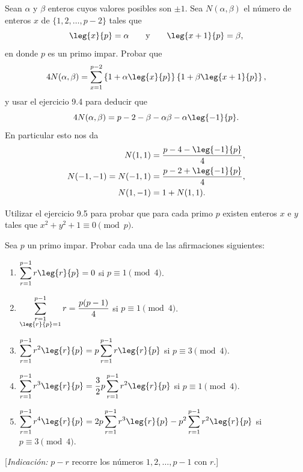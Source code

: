 \documentclass[12pt,a4paper]{book}
\begin{document}
    \begin{ejercicio}
        Sean $\alpha$ y $\beta$ enteros cuyos valores posibles son $\pm1$. Sea
        $N(\alpha,\beta)$ el número de enteros $x$ de $\{1,2,\dots,p-2\}$ tales que
        \begin{equation*}
            \leg{x}{p}=\alpha\qquad\text{y}\qquad\leg{x+1}{p}=\beta,
        \end{equation*}
        en donde $p$ es un primo impar. Probar que
        \begin{equation*}
            4N(\alpha,\beta)=\sum_{x=1}^{p-2}\left\{1+\alpha\leg{x}{p}\right\}\left\{1+\beta\leg{x+1}{p}\right\},
        \end{equation*}
        y usar el ejercicio 9.4 para deducir que
        \begin{equation*}
            4N(\alpha,\beta)=p-2-\beta-\alpha\beta-\alpha\leg{-1}{p}.
        \end{equation*}
        En particular esto nos da
        \begin{align*}
            N(1,1)&=\frac{p-4-\leg{-1}{p}}{4},\\
            N(-1,-1)=N(-1,1)&=\frac{p-2+\leg{-1}{p}}{4},\\
            N(1,-1)&=1+N(1,1).
        \end{align*}
    \end{ejercicio}

    \begin{ejercicio}
        Utilizar el ejercicio 9.5 para probar que para cada primo $p$ existen enteros $x$ e
        $y$ tales que $x^{2}+y^{2}+1\equiv0\pmod{p}$.
    \end{ejercicio}

    \begin{ejercicio}
        Sea $p$ un primo impar. Probar cada una de las afirmaciones siguientes:
        \begin{enumerate}
            \item[(a)] $\displaystyle\sum_{r=1}^{p-1}r\leg{r}{p}=0$ si $p\equiv1\pmod{4}$.
            \item[(b)] $\displaystyle\sum_{\substack{r=1\\\leg{r}{p}=1}}^{p-1}r=\frac{p(p-1)}{4}$ si $p\equiv1\pmod{4}$.
            \item[(c)] $\displaystyle\sum_{r=1}^{p-1}r^{2}\leg{r}{p}=p\sum_{r=1}^{p-1}r\leg{r}{p}$ si $p\equiv3\pmod{4}$.
            \item[(d)] $\displaystyle\sum_{r=1}^{p-1}r^{3}\leg{r}{p}=\frac{3}{2}p\sum_{r=1}^{p-1}r^{2}\leg{r}{p}$ si $p\equiv1\pmod{4}$.
            \item[(e)] $\displaystyle\sum_{r=1}^{p-1}r^{4}\leg{r}{p}=2p\sum_{r=1}^{p-1}r^{3}\leg{r}{p}-p^{2}\sum_{r=1}^{p-1}r^{2}\leg{r}{p}$ si $p\equiv3\pmod{4}$.
        \end{enumerate}
        [\textit{Indicación:} $p-r$ recorre los números $1,2,\dots,p-1$ con $r$.]
    \end{ejercicio}
\end{document}
